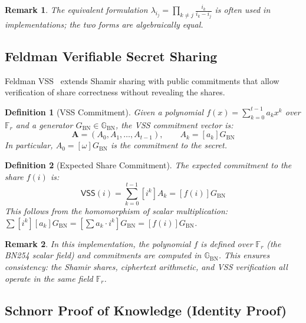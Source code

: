 \documentclass[11pt,a4paper]{article}
\newtheorem{definition}{Definition}[section]
\newtheorem{remark}{Remark}[section]
\newcommand{\F}{\mathbb{F}}
\newcommand{\G}{\mathbb{G}}
\newcommand{\Gbn}{\G_{\mathrm{BN}}}
\newcommand{\Fr}{\F_r}
\newcommand{\genbn}{G_{\mathrm{BN}}}
\newcommand{\VSS}{\mathsf{VSS}}
\begin{document}
\begin{remark}
  The equivalent formulation $\lambda_{i_j} = \prod_{k \ne j} \frac{i_k}{i_k - i_j}$
  is often used in implementations; the two forms are algebraically equal.
\end{remark}

\subsection{Feldman Verifiable Secret Sharing}
\label{sec:vss}

Feldman VSS~\cite{feldman1987} extends Shamir sharing with public
commitments that allow verification of share correctness without
revealing the shares.

\begin{definition}[VSS Commitment]
  \label{def:vsscommit}
  Given a polynomial $f(x) = \sum_{k=0}^{t-1} a_k x^k$ over $\Fr$ and a
  generator $\genbn \in \Gbn$, the VSS commitment vector is:
  \begin{equation}
    \mathbf{A} = (A_0, A_1, \ldots, A_{t-1}), \qquad A_k = [a_k]\genbn
  \end{equation}
  In particular, $A_0 = [\omega]\genbn$ is the commitment to the secret.
\end{definition}

\begin{definition}[Expected Share Commitment]
  \label{def:expectedshare}
  The expected commitment to the share $f(i)$ is:
  \begin{equation}
    \VSS(i) = \sum_{k=0}^{t-1} [i^k] A_k = [f(i)] \genbn
    \label{eq:vss-verify}
  \end{equation}
  This follows from the homomorphism of scalar multiplication:
  $\sum [i^k] [a_k] \genbn = [\sum a_k \cdot i^k] \genbn = [f(i)] \genbn$.
\end{definition}

\begin{remark}
  In this implementation, the polynomial $f$ is defined over $\Fr$ (the BN254
  scalar field) and commitments are computed in $\Gbn$. This ensures
  consistency: the Shamir shares, ciphertext arithmetic, and VSS verification
  all operate in the same field $\Fr$.
\end{remark}

\subsection{Schnorr Proof of Knowledge (Identity Proof)}
\label{sec:schnorr}
\end{document}
